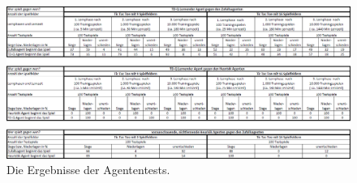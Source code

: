 \begin{figure}[!htbp]
  \centering
  \includegraphics[angle = 90, scale = 0.8]{inhalt/abbildungen/testergebnisse.png}
  \caption{Die Ergebnisse der Agententests.}
  \label{fig:Ergebnisse der Agententests}
\end{figure} 
